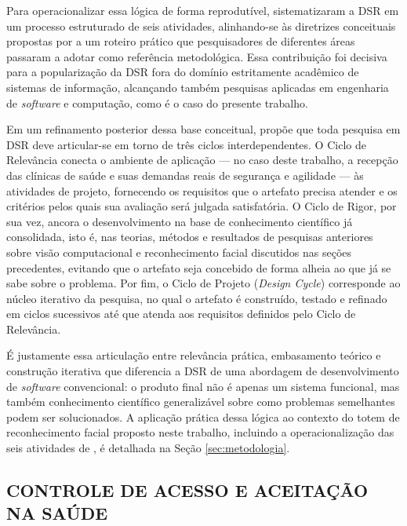 Para operacionalizar essa lógica de forma reprodutível,  sistematizaram a DSR em um processo estruturado de seis atividades, alinhando-se às diretrizes conceituais propostas por  a um roteiro prático que pesquisadores de diferentes áreas passaram a adotar como referência metodológica. Essa contribuição foi decisiva para a popularização da DSR fora do domínio estritamente acadêmico de sistemas de informação, alcançando também pesquisas aplicadas em engenharia de \textit{software} e computação, como é o caso do presente trabalho.

Em um refinamento posterior dessa base conceitual,  propõe que toda pesquisa em DSR deve articular-se em torno de três ciclos interdependentes. O Ciclo de Relevância conecta o ambiente de aplicação — no caso deste trabalho, a recepção das clínicas de saúde e suas demandas reais de segurança e agilidade — às atividades de projeto, fornecendo os requisitos que o artefato precisa atender e os critérios pelos quais sua avaliação será julgada satisfatória. O Ciclo de Rigor, por sua vez, ancora o desenvolvimento na base de conhecimento científico já consolidada, isto é, nas teorias, métodos e resultados de pesquisas anteriores sobre visão computacional e reconhecimento facial discutidos nas seções precedentes, evitando que o artefato seja concebido de forma alheia ao que já se sabe sobre o problema. Por fim, o Ciclo de Projeto (\textit{Design Cycle}) corresponde ao núcleo iterativo da pesquisa, no qual o artefato é construído, testado e refinado em ciclos sucessivos até que atenda aos requisitos definidos pelo Ciclo de Relevância.

É justamente essa articulação entre relevância prática, embasamento teórico e construção iterativa que diferencia a DSR de uma abordagem de desenvolvimento de \textit{software} convencional: o produto final não é apenas um sistema funcional, mas também conhecimento científico generalizável sobre como problemas semelhantes podem ser solucionados. A aplicação prática dessa lógica ao contexto do totem de reconhecimento facial proposto neste trabalho, incluindo a operacionalização das seis atividades de , é detalhada na Seção \ref{sec:metodologia}.

\subsection{CONTROLE DE ACESSO E ACEITAÇÃO NA SAÚDE}
\label{subsec:controle-acesso}

